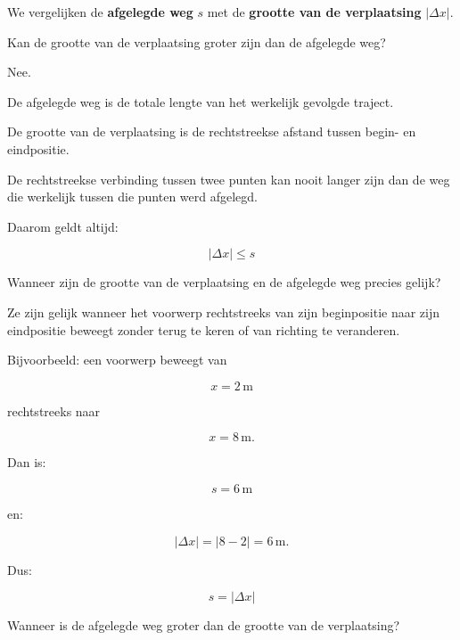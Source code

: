 \documentclass{ximera}
\begin{document}
  \begin{oefening}{\oefU}
  
  We vergelijken de \textbf{afgelegde weg} $s$ met de
  \textbf{grootte van de verplaatsing} $|\Delta x|$.
  
  
  \begin{question}
  Kan de grootte van de verplaatsing groter zijn dan de afgelegde weg?
  
  \begin{oplossing}
  Nee.
  
  De afgelegde weg is de totale lengte van het werkelijk gevolgde traject.
  
  De grootte van de verplaatsing is de rechtstreekse afstand tussen begin- en
  eindpositie.
  
  De rechtstreekse verbinding tussen twee punten kan nooit langer zijn dan de
  weg die werkelijk tussen die punten werd afgelegd.
  
  Daarom geldt altijd:
  
  \[
  \boxed{|\Delta x|\leq s}
  \]
  \end{oplossing}
  \end{question}
  
  
  \begin{question}
  Wanneer zijn de grootte van de verplaatsing en de afgelegde weg precies gelijk?
  
  \begin{oplossing}
  Ze zijn gelijk wanneer het voorwerp rechtstreeks van zijn beginpositie naar
  zijn eindpositie beweegt zonder terug te keren of van richting te veranderen.
  
  Bijvoorbeeld: een voorwerp beweegt van
  
  \[
  x=2\,\mathrm{m}
  \]
  
  rechtstreeks naar
  
  \[
  x=8\,\mathrm{m}.
  \]
  
  Dan is:
  
  \[
  s=6\,\mathrm{m}
  \]
  
  en:
  
  \[
  |\Delta x|
  =
  |8-2|
  =
  6\,\mathrm{m}.
  \]
  
  Dus:
  
  \[
  \boxed{s=|\Delta x|}
  \]
  \end{oplossing}
  \end{question}
  
  
  \begin{question}
  Wanneer is de afgelegde weg groter dan de grootte van de verplaatsing?
  

\end{question}
\end{oefening}
\end{document}
